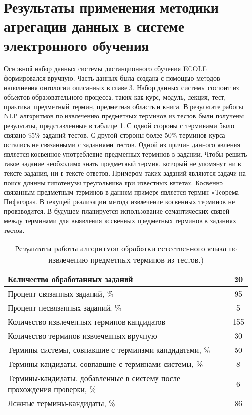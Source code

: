 
\section{Результаты применения методики агрегации данных в системе электронного обучения} \label{sect4_4}

Основной набор данных системы дистанционного обучения ECOLE формировался вручную. Часть данных была создана с помощью методов наполнения онтологии описанных в главе 3. Набор данных системы состоит из объектов образовательного процесса, таких как курс, модуль, лекция, тест, практика, предметный термин, предметная область и книга. В результате работы NLP  алгоритмов по извлечению предметных терминов из тестов были получены результаты, представленные в таблице \ref{table:nlp_resutls}. С одной стороны с терминами было связано 95\% заданий тестов. С другой стороны более 50\% терминов курса остались не связанными с заданиями тестов. Одной из причин данного явления является косвенное употребление предметных терминов в задании. Чтобы решить такое задание необходимо знать предметный термин, который не упомянут ни в тексте задания, ни в тексте ответов. Примером таких заданий являются задачи на поиск длинны гипотенузы треугольника при известных катетах. Косвенно связанным предметным терминов в данном примере является термин «Теорема Пифагора». В текущей реализации метода извлечение косвенных терминов не производится. В будущем планируется использование семантических связей между терминами для выявления косвенных предметных терминов в заданиях тестов.

\begin{table}[h!]
\centering
\caption{Результаты работы алгоритмов обработки естественного языка по извлечению предметных терминов из тестов.)}
\label{table:nlp_resutls}
\begin{tabular}{ |p{12cm}|c|  }
\hline Количество обработанных заданий & 20 \\
\hline Процент связанных заданий, \% & 95 \\
\hline Процент несвязанных заданий, \% & 5 \\
\hline Количество извлеченных терминов-кандидатов & 155 \\
\hline Количество терминов извлеченных вручную & 30 \\
\hline Термины системы, совпавшие с терминами-кандидатами, \% & 50 \\
\hline Термины-кандидаты, совпавшие с терминами системы, \% & 8 \\
\hline Термины-кандидаты, добавленные в систему после прохождения проверки, \%  & 6 \\
\hline Ложные термины-кандидаты, \% & 86 \\
\hline
\end{tabular}
\end{table}  


